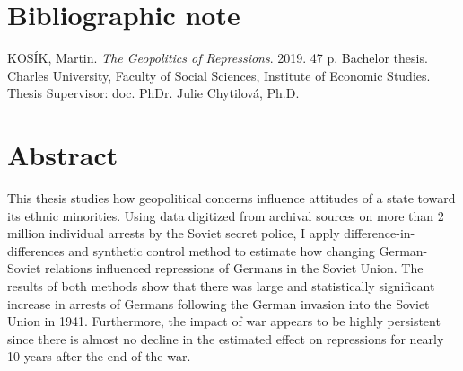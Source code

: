 \pagestyle{empty}

\section*{Bibliographic note}

\noindent KOSÍK, Martin. \textit{The Geopolitics of Repressions}.  2019. 47 p.
Bachelor thesis. Charles University, Faculty of Social Sciences, Institute of Economic Studies. Thesis Supervisor: doc. PhDr. Julie Chytilová, Ph.D. \\

\section*{Abstract}
  This thesis studies how geopolitical concerns influence attitudes of a state toward its ethnic minorities.
    Using  data digitized from archival sources on  more than 2 million individual arrests by the Soviet secret police, I apply difference-in-differences and synthetic control method to estimate how changing German-Soviet relations influenced repressions of Germans in the Soviet Union. 
   The results of both methods show that
   there was large and statistically significant increase in arrests of Germans following the German invasion into the Soviet Union in 1941.
   Furthermore, the impact of war  appears to be highly persistent since there is almost  no decline in the estimated effect on repressions for nearly 10 years after the end of the war.
   
   

